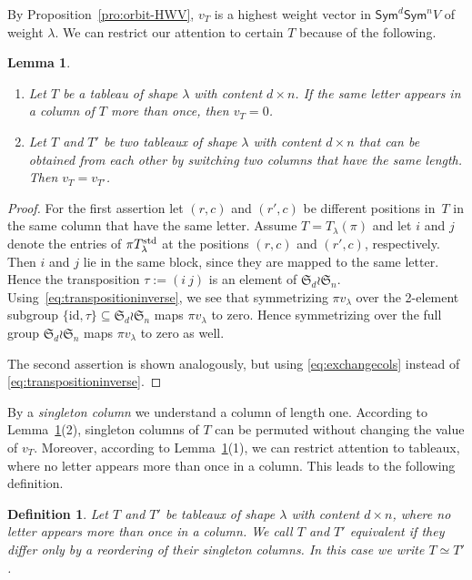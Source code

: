 \documentclass[11pt]{amsart}
\def\Sym{\mathsf{Sym}}
\def\la{\lambda}
\newcommand{\out}{d}
\newcommand{\inn}{n}
\newcommand{\aS}{\ensuremath{\mathfrak{S}}}
\numberwithin{equation}{section}
\newtheorem{lemma}[theorem]{Lemma}
\newtheorem{definition}[theorem]{Definition}
\begin{document}
By Proposition~\ref{pro:orbit-HWV}, $v_T$ is a highest weight vector
in $\Sym^d\Sym^n V$ of weight $\la$. 
We can restrict our attention to certain $T$ because of the following. 

\begin{lemma}\label{cla:wedgevanish}
\begin{enumerate}
\item Let $T$ be a tableau of shape $\la$ with content $\out \times \inn$.
If the same letter appears in a column of $T$ more than once, then $v_T=0$.
\item Let $T$ and $T'$ be two tableaux of shape $\la$ with content $\out \times \inn$
that can be obtained from each other by switching two columns that have the same length.
Then $v_T=v_{T'}$.
\end{enumerate}
\end{lemma}

\begin{proof}
For the first assertion let $(r,c)$ and $(r',c)$ be different positions in~$T$ in the same column 
that have the same letter.
Assume $T=T_\la(\pi)$ and let $i$ and $j$ denote the entries of $\pi T^{\textup{std}}_\la$ 
at the positions $(r,c)$ and $(r',c)$, respectively.
Then $i$ and $j$ lie in the same block, since they are mapped to the same letter. 
Hence the transposition $\tau := (i \ j)$ is an element of $\aS_d \wr \aS_n$.
Using~\eqref{eq:transpositioninverse}, we see that
symmetrizing $\pi v_\la$ over the 2-element subgroup 
$\{\text{id}, \tau\} \subseteq \aS_d \wr \aS_n$ maps $\pi v_\la$ to zero. 
Hence symmetrizing over the full group $\aS_{d} \wr \aS_n$ maps $\pi v_\la$ 
to zero as well. 

The second assertion is shown analogously, 
but using \eqref{eq:exchangecols} instead of \eqref{eq:transpositioninverse}.
\end{proof}

By a \emph{singleton column} we understand a column of length one. 
According to Lemma~\ref{cla:wedgevanish}(2), singleton columns of $T$ 
can be permuted without changing the value of $v_T$. 
Moreover, according to Lemma~\ref{cla:wedgevanish}(1), 
we can restrict attention to tableaux,  
where no letter appears more than once in a column. 
This leads to the following definition. 

\begin{definition}\label{def:tabl-class}
Let $T$ and $T'$ be tableaux of shape $\la$ with content $d \times n$, 
where no letter appears more than once in a column.
We call $T$ and $T'$ {\em equivalent} if they differ only by a reordering of their singleton columns.
In this case we write $T \simeq T'$.
\end{definition}
\end{document}
